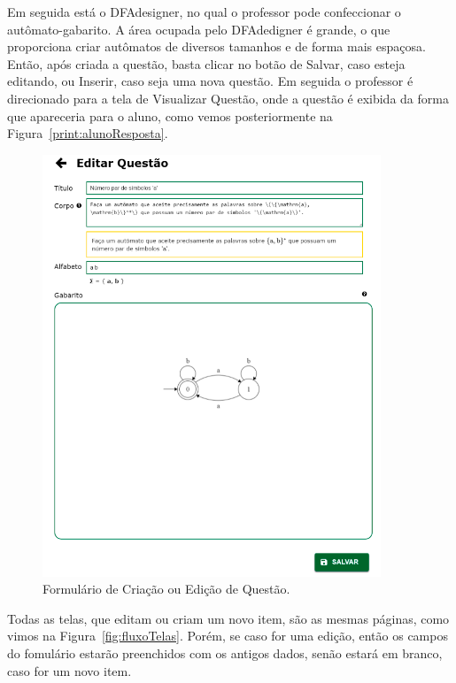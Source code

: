 \documentclass[
	12pt,				%
	openany,
	oneside,
	a4paper,			%
	english,			%
	brazil				%
	]{abntex2}
\begin{document}
  Em seguida está o DFAdesigner, no qual o professor pode confeccionar o autômato-gabarito. A área ocupada pelo DFAdedigner é grande, o que proporciona criar autômatos de diversos tamanhos e de forma mais espaçosa. Então, após criada a questão, basta clicar no botão de Salvar, caso esteja editando, ou Inserir, caso seja uma nova questão. Em seguida o professor é direcionado para a tela de Visualizar Questão, onde a questão é exibida da forma que apareceria para o aluno, como vemos posteriormente na Figura~\ref{print:alunoResposta}.
 

\begin{figure}[H]
  \centering
  \includegraphics[width=0.9\textwidth]{prints/profEditarQuestao.png}
  \caption{Formulário de Criação ou Edição de Questão.}
  \label{print:profEditarQuestao}
  \vspace{-0.5cm}
\end{figure}

  Todas as telas, que editam ou criam um novo item, são as mesmas páginas, como vimos na Figura~\ref{fig:fluxoTelas}. Porém, se caso for uma edição, então os campos do fomulário estarão preenchidos com os antigos dados, senão estará em branco, caso for um novo item.
  
\end{document}
